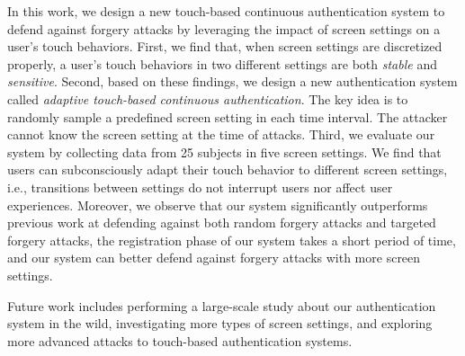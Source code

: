 \documentclass{sig-alternate-05-2015}
\begin{document}
In this work, we design a new touch-based continuous authentication system
 to defend against forgery attacks by leveraging the impact of screen 
settings on a user's touch behaviors.  First, we find that, when screen settings are discretized properly, a user's
touch behaviors in two different settings are both \emph{stable} and
\emph{sensitive}.  Second, based on these findings, we design a new authentication system called
\emph{adaptive touch-based continuous authentication}. The key idea is to randomly sample a predefined screen setting  in each time interval. The attacker cannot know the screen setting at the time of attacks. 
Third, we evaluate our system by collecting
data from 25 subjects in five screen settings. We find that  users can subconsciously 
adapt their touch behavior to different screen settings, 
i.e., transitions between settings do not interrupt users nor affect user experiences. 
 Moreover, we observe that our system
significantly outperforms previous work at defending against both random forgery
attacks and targeted forgery attacks, the registration phase of our system takes a short
period of time,  and our system can better defend  against forgery attacks with more 
screen settings.

Future work includes performing a large-scale study about our authentication system in the wild, investigating more types of screen settings,  and 
exploring more advanced attacks to touch-based authentication systems.
\end{document}
